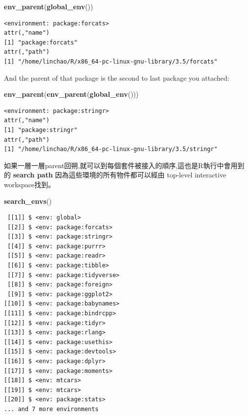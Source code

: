 \documentclass[]{book}
\newenvironment{Shaded}{\begin{snugshade}}{\end{snugshade}}
\newcommand{\KeywordTok}[1]{\textcolor[rgb]{0.13,0.29,0.53}{\textbf{#1}}}
\newcommand{\NormalTok}[1]{#1}
\theoremstyle{definition}
\theoremstyle{definition}
\theoremstyle{definition}
\theoremstyle{remark}
\begin{document}
\begin{Shaded}
\begin{Highlighting}[]
\KeywordTok{env_parent}\NormalTok{(}\KeywordTok{global_env}\NormalTok{())}
\end{Highlighting}
\end{Shaded}

\begin{verbatim}
<environment: package:forcats>
attr(,"name")
[1] "package:forcats"
attr(,"path")
[1] "/home/linchao/R/x86_64-pc-linux-gnu-library/3.5/forcats"
\end{verbatim}

And the parent of that package is the second to last package you
attached:

\begin{Shaded}
\begin{Highlighting}[]
\KeywordTok{env_parent}\NormalTok{(}\KeywordTok{env_parent}\NormalTok{(}\KeywordTok{global_env}\NormalTok{()))}
\end{Highlighting}
\end{Shaded}

\begin{verbatim}
<environment: package:stringr>
attr(,"name")
[1] "package:stringr"
attr(,"path")
[1] "/home/linchao/R/x86_64-pc-linux-gnu-library/3.5/stringr"
\end{verbatim}

如果一層一層parent回朔,就可以到每個套件被接入的順序,這也是R執行中會用到的
\textbf{search path} 因為這些環境的所有物件都可以經由 top-level
interactive workspace找到。

\begin{Shaded}
\begin{Highlighting}[]
\KeywordTok{search_envs}\NormalTok{()}
\end{Highlighting}
\end{Shaded}

\begin{verbatim}
 [[1]] $ <env: global>
 [[2]] $ <env: package:forcats>
 [[3]] $ <env: package:stringr>
 [[4]] $ <env: package:purrr>
 [[5]] $ <env: package:readr>
 [[6]] $ <env: package:tibble>
 [[7]] $ <env: package:tidyverse>
 [[8]] $ <env: package:foreign>
 [[9]] $ <env: package:ggplot2>
[[10]] $ <env: package:babynames>
[[11]] $ <env: package:bindrcpp>
[[12]] $ <env: package:tidyr>
[[13]] $ <env: package:rlang>
[[14]] $ <env: package:usethis>
[[15]] $ <env: package:devtools>
[[16]] $ <env: package:dplyr>
[[17]] $ <env: package:moments>
[[18]] $ <env: mtcars>
[[19]] $ <env: mtcars>
[[20]] $ <env: package:stats>
... and 7 more environments
\end{verbatim}
\end{document}
